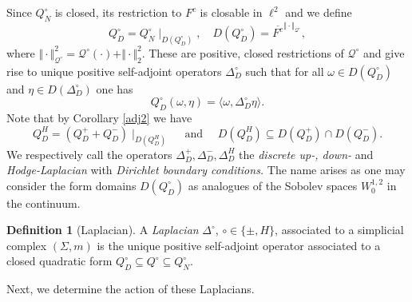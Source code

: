 \documentclass[10pt]{amsart}
\theoremstyle{definition}
\newtheorem{definition}[theorem]{Definition}
\newcommand{\F}{{F}}
\renewcommand{\bullet}{{\circ}}
\newcommand{\Q}{\mathcal{Q}}
\begin{document}
Since $Q^{\bullet}_{N}$ is closed, its restriction to $F^{c}$ is closable in $\ell^{2}$ and we define 
 $$Q^{\bullet}_{D} = Q^\bullet_{N}\mid_{D(Q^\bullet_{D})},\quad D(Q^{\bullet}_{D}) = \overline{\F^c}^{\Vert\cdot\Vert_{\Q^{\bullet}}},$$
where $\Vert\cdot\Vert_{\Q^\bullet}^2 = \Q^\bullet(\cdot)+\Vert\cdot\Vert^2_2.$ These are positive, closed restrictions of $\Q^\bullet$ and give rise to unique positive self-adjoint  operators $\Delta^{\bullet}_{D}$ such that for all $\omega\in D(Q^\bullet_{D})$ and $\eta\in D(\Delta^\bullet_{D})$ one has
$$Q^\bullet_{D}(\omega,\eta) = \langle \omega,\Delta^\bullet_{D}\eta\rangle.$$
Note that by Corollary \ref{adj2} we have 
 $$Q^H_{D}  =(Q^+_{D}+Q^-_{D})\mid_{D(Q^H_{D})}\quad\mbox{ and } \quad D(Q^H_{D}) \subseteq D(Q^+_{D})\cap D(Q^-_{D}).$$ We respectively call the operators $\Delta^+_{D},\Delta^-_{D},\Delta^H_{D}$ the \textit{discrete up-, down-} and \textit{Hodge-Laplacian} with \textit{Dirichlet boundary conditions.} The name arises as one may consider the form domains $D(Q^{\bullet}_{D})$ as analogues of the Sobolev spaces $W^{1,2}_{0} $ in the continuum.
 
\begin{definition}[Laplacian]\label{def:Laplacian} A \emph{Laplacian} $\Delta^{\bullet}$, $\bullet\in\{\pm,H\}$, associated to a simplicial complex $(\Sigma,m)$ is  the unique positive self-adjoint operator associated to a closed quadratic form $Q^{\bullet}_{D}\subseteq Q^{\bullet}\subseteq Q^{\bullet}_{N}$.
\end{definition}
 Next, we determine the action of these Laplacians.
\end{document}
